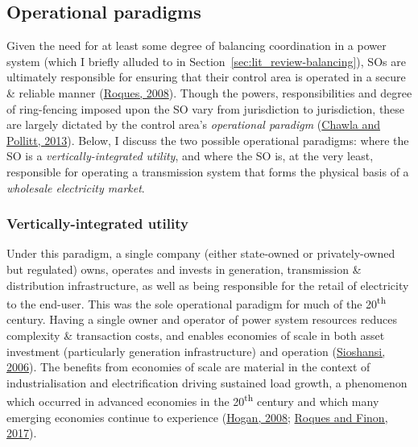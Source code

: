 \documentclass[12pt,a4paper,]{report}
\begin{document}
\hypertarget{sec:lit_review-operational_paradigms}{%
\subsection{Operational
paradigms}\label{sec:lit_review-operational_paradigms}}

Given the need for at least some degree of balancing coordination in a
power system (which I briefly alluded to in
Section~\ref{sec:lit_review-balancing}), SOs are ultimately responsible
for ensuring that their control area is operated in a secure \& reliable
manner (\protect\hyperlink{ref-roquesMarketDesignGeneration2008}{Roques,
2008}). Though the powers, responsibilities and degree of ring-fencing
imposed upon the SO vary from jurisdiction to jurisdiction, these are
largely dictated by the control area's \emph{operational paradigm}
(\protect\hyperlink{ref-chawlaGlobalTrendsElectricity2013}{Chawla and
Pollitt, 2013}). Below, I discuss the two possible operational
paradigms: where the SO is a \emph{vertically-integrated utility}, and
where the SO is, at the very least, responsible for operating a
transmission system that forms the physical basis of a \emph{wholesale
electricity market}.

\hypertarget{vertically-integrated-utility}{%
\subsubsection{Vertically-integrated
utility}\label{vertically-integrated-utility}}

Under this paradigm, a single company (either state-owned or
privately-owned but regulated) owns, operates and invests in generation,
transmission \& distribution infrastructure, as well as being
responsible for the retail of electricity to the end-user. This was the
sole operational paradigm for much of the 20\textsuperscript{th}
century. Having a single owner and operator of power system resources
reduces complexity \& transaction costs, and enables economies of scale
in both asset investment (particularly generation infrastructure) and
operation
(\protect\hyperlink{ref-sioshansiElectricityMarketReform2006}{Sioshansi,
2006}). The benefits from economies of scale are material in the context
of industrialisation and electrification driving sustained load growth,
a phenomenon which occurred in advanced economies in the
20\textsuperscript{th} century and which many emerging economies
continue to experience
(\protect\hyperlink{ref-hoganElectricityMarketStructure2008}{Hogan,
2008};
\protect\hyperlink{ref-roquesAdaptingElectricityMarkets2017}{Roques and
Finon, 2017}).
\end{document}
